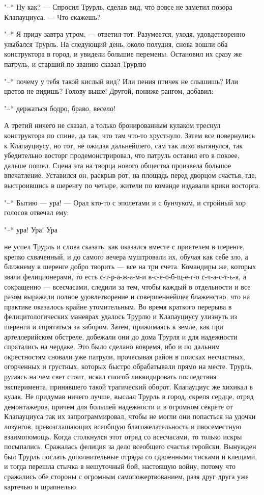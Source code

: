 "--* Ну как? --- Спросил Трурль, сделав вид, что вовсе не
заметил позора Клапауциуса. --- Что скажешь?

"--* Я приду завтра утром, --- ответил тот. Разумеется,
уходя, удовдетворенно улыбался Трурль. На следующий день,
около полудня, снова вошли оба конструктора в город, и
увидели большие перемены. Остановил их сразу же патруль, и
старший по званию сказал Трурлю

"--* почему у тебя такой кислый вид? Или пения птичек не
слышишь? Или цветов не видишь? Голову выше! Другой, пониже
рангом, добавил:

"--* держаться бодро, браво, весело!

А третий ничего не сказал, а только бронированным кулаком
треснул конструктора по спине, да так, что там что-то
хрустнуло. Затем все повернулись к Клапауциусу, но тот, не
ожидая дальнейшего, сам так лихо вытянулся, так убедительно
восторг продемонстрировал, что патруль оставил его в покоее,
дальше пошел. Сцена эта на творца нового общества произвела
большое впечатление. Уставился он, раскрыв рот, на площадь
перед дворцом счастья, где, выстроившись в шеренгу по
четыре, жители по команде издавали крики восторга.

"--* Бытию --- ура! --- Орал кто-то с эполетами и с бунчуком,
и стройный хор голосов отвечал ему:

"--* ура! Ура! Ура

не успел Трурль и слова сказать, как оказался вместе с
приятелем в шеренге, крепко схваченный, и до самого вечера
муштровали их, обучая как себе зло, а ближнему в шеренге
добро творить --- все на три счета. Командиры же, которых
звали фелиционерами, то есть с-т-р-а-ж-а-м-и
в-с-е-о-б-щ-е-г-о с-ч-а-с-т-ь-я, а сокращенно --- всесчасами,
следили за тем, чтобы каждый в отдельности и все разом
выражали полное удовлетворение и совершеннейшее блаженство,
что на практике оказалось крайне утомительным. Во время
краткого перерыва в фелицитологических маневрах удалось
Трурлю и Клапауциусу улизнуть из шеренги и спрятаться за
забором. Затем, прижимаясь к земле, как при артеллерийском
обстреле, добежали они до дома Трурля и для надежности
спрятались на чердаке. Это было сделано вовремя, ибо и по
дальним окрестностям сновали уже патрули, прочесывая район в
поисках несчастных, огорченных и грустных, которых быстро
обрабатывали прямо на месте. Трурль, ругаясь на чем свет
стоит, искал способ ликвидировать последствия эксперимента,
принявшего такой трагический оборот. Клапауциус же хихикал в
кулак. Не придумав ничего лучше, выслал Трурль в город,
скрепя сердце, отряд демонтажеров, причем для большей
надежности и в огромном секрете от Клапауциуса так их
запрограммировал, чтобы не могли они попасться на удочки
лозунгов, превозглашающих всеобщую благожелательность и
пвосеместную взаимопомощь. Когда столкнулся этот отряд со
всесчасами, то только искры посыпались. Сражалась фелиция за
дело всеобщего счастья геройски. Вынужден был Трурль послать
дополнительные отряды со сдвоенными тисками и клещами, и
тогда перешла стычка в нешуточный бой, настоящую войну,
потому что сражались обе стороны с огромным
самопожертвованием, разя друг друга уже картечью и
шрапнелью.

